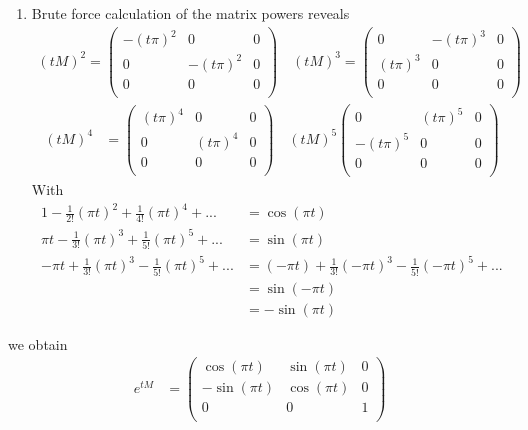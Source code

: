 \documentclass[10pt,a4paper]{book}
\theoremstyle{definition}
\begin{document}
\begin{enumerate}
\item Brute force calculation of the matrix powers reveals
\begin{align}
(tM)^2=\left(
\begin{array}{ccc}
 -(t\pi)^2 & 0 & 0 \\
 0 & -(t\pi)^2 & 0 \\
 0 & 0 & 0 \\
\end{array}
\right)\quad
(tM)^3=\left(
\begin{array}{ccc}
 0 & -(t\pi)^3 & 0 \\
 (t\pi)^3 & 0 & 0 \\
 0 & 0 & 0 \\
\end{array}
\right)
\end{align}
\begin{align}
(tM)^4&=\left(
\begin{array}{ccc}
(t\pi)^4 & 0 & 0 \\
 0 & (t\pi)^4 & 0 \\
 0 & 0 & 0 \\
\end{array}
\right)\quad
(tM)^5\left(
\begin{array}{ccc}
 0 & (t\pi)^5 & 0 \\
 -(t\pi)^5 & 0 & 0 \\
 0 & 0 & 0 \\
\end{array}
\right)
\end{align}
With
\begin{align}
    1-\frac{1}{2!}(\pi t)^2+\frac{1}{4!}(\pi t)^4+...&=\cos(\pi t)\\
    \pi t - \frac{1}{3!}(\pi t)^3+ \frac{1}{5!}(\pi t)^5+...&=\sin(\pi t)\\
    -\pi t + \frac{1}{3!}(\pi t)^3- \frac{1}{5!}(\pi t)^5+...&=(-\pi t) + \frac{1}{3!}(-\pi t)^3- \frac{1}{5!}(-\pi t)^5+...\\
    &=\sin(-\pi t)\\
    &=-\sin(\pi t)
\end{align}
\end{enumerate}
we obtain
\begin{align}
e^{tM}&=\left(
\begin{array}{ccc}
 \cos(\pi t) & \sin(\pi t) & 0 \\
 -\sin(\pi t) & \cos(\pi t) & 0 \\
 0 & 0 & 1 \\
\end{array}
\right)
\end{align}
\end{document}
